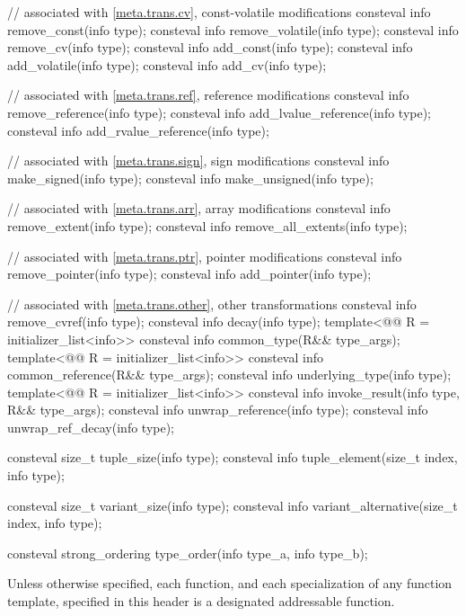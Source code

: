 \begin{codeblock}
{  // associated with \ref{meta.trans.cv}, const-volatile modifications
  consteval info remove_const(info type);
  consteval info remove_volatile(info type);
  consteval info remove_cv(info type);
  consteval info add_const(info type);
  consteval info add_volatile(info type);
  consteval info add_cv(info type);

  // associated with \ref{meta.trans.ref}, reference modifications
  consteval info remove_reference(info type);
  consteval info add_lvalue_reference(info type);
  consteval info add_rvalue_reference(info type);

  // associated with \ref{meta.trans.sign}, sign modifications
  consteval info make_signed(info type);
  consteval info make_unsigned(info type);

  // associated with \ref{meta.trans.arr}, array modifications
  consteval info remove_extent(info type);
  consteval info remove_all_extents(info type);

  // associated with \ref{meta.trans.ptr}, pointer modifications
  consteval info remove_pointer(info type);
  consteval info add_pointer(info type);

  // associated with \ref{meta.trans.other}, other transformations
  consteval info remove_cvref(info type);
  consteval info decay(info type);
  template<@@ R = initializer_list<info>>
    consteval info common_type(R&& type_args);
  template<@@ R = initializer_list<info>>
    consteval info common_reference(R&& type_args);
  consteval info underlying_type(info type);
  template<@@ R = initializer_list<info>>
    consteval info invoke_result(info type, R&& type_args);
  consteval info unwrap_reference(info type);
  consteval info unwrap_ref_decay(info type);

  consteval size_t tuple_size(info type);
  consteval info tuple_element(size_t index, info type);

  consteval size_t variant_size(info type);
  consteval info variant_alternative(size_t index, info type);

  consteval strong_ordering type_order(info type_a, info type_b);
}
\end{codeblock}

\pnum
Unless otherwise specified,
each function, and each specialization of any function template,
specified in this header
is a designated addressable function.

